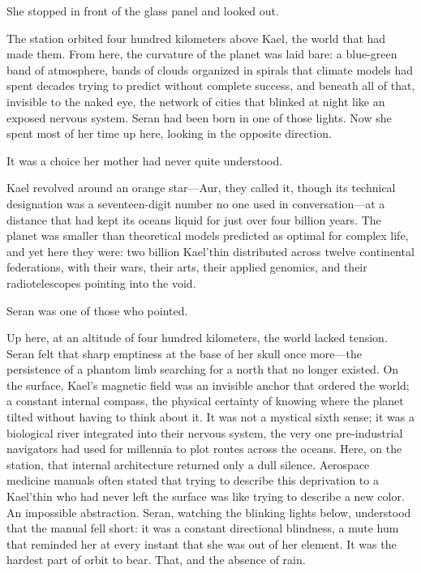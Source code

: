 \documentclass[11pt,a5paper,twoside]{book}
\begin{document}
She stopped in front of the glass panel and looked out.

The station orbited four hundred kilometers above Kael, the world that had made them. From here, the curvature of the planet was laid bare: a blue-green band of atmosphere, bands of clouds organized in spirals that climate models had spent decades trying to predict without complete success, and beneath all of that, invisible to the naked eye, the network of cities that blinked at night like an exposed nervous system. Seran had been born in one of those lights. Now she spent most of her time up here, looking in the opposite direction.

It was a choice her mother had never quite understood.

Kael revolved around an orange star—Aur, they called it, though its technical designation was a seventeen-digit number no one used in conversation—at a distance that had kept its oceans liquid for just over four billion years. The planet was smaller than theoretical models predicted as optimal for complex life, and yet here they were: two billion Kael'thin distributed across twelve continental federations, with their wars, their arts, their applied genomics, and their radiotelescopes pointing into the void.

Seran was one of those who pointed.

Up here, at an altitude of four hundred kilometers, the world lacked tension. Seran felt that sharp emptiness at the base of her skull once more—the persistence of a phantom limb searching for a north that no longer existed. On the surface, Kael’s magnetic field was an invisible anchor that ordered the world; a constant internal compass, the physical certainty of knowing where the planet tilted without having to think about it. It was not a mystical sixth sense; it was a biological river integrated into their nervous system, the very one pre-industrial navigators had used for millennia to plot routes across the oceans. Here, on the station, that internal architecture returned only a dull silence. Aerospace medicine manuals often stated that trying to describe this deprivation to a Kael'thin who had never left the surface was like trying to describe a new color. An impossible abstraction. Seran, watching the blinking lights below, understood that the manual fell short: it was a constant directional blindness, a mute hum that reminded her at every instant that she was out of her element. It was the hardest part of orbit to bear. That, and the absence of rain.
\end{document}
